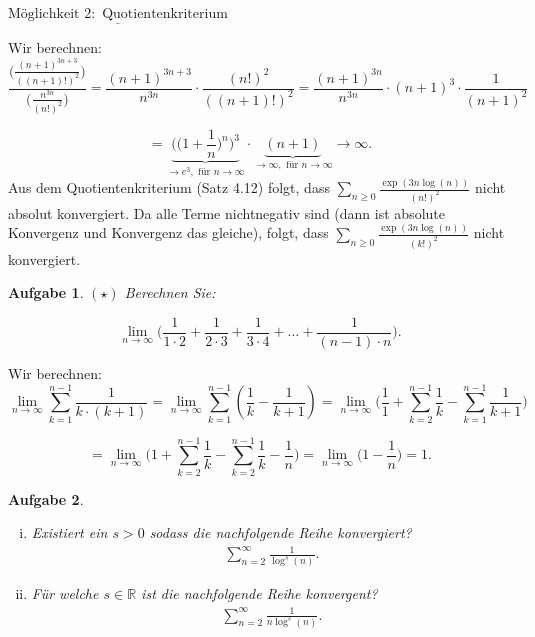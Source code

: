 \documentclass[a4paper, 20]{exam}
\newtheorem{ex}{Aufgabe}
\begin{document}
\begin{solution}
\begin{enumerate}[i.)]
$\underline{\text{M\"oglichkeit }2: \text{ Quotientenkriterium}}$

Wir berechnen:
$$ \frac{\bigg(\frac{(n+1)^{3n+3}}{((n+1)!)^2} \bigg)}{\bigg(\frac{n^{3n}}{(n!)^2} \bigg)} 
= \frac{(n+1)^{3n+3}}{n^{3n}} \cdot \frac{(n!)^2}{((n+1)!)^2}
= \frac{(n+1)^{3n}}{n^{3n}} \cdot (n+1)^3 \cdot \frac{1}{(n+1)^2}$$

$$=\underbrace{\bigg(\Big( 1+ \frac{1}{n} \Big)^{n}\bigg)^3}_{\longrightarrow e^3, \text{ f\"ur } n\longrightarrow \infty} \cdot \underbrace{(n+1)}_{\longrightarrow \infty, \text{ f\"ur } n \longrightarrow \infty} \longrightarrow \infty.$$
Aus dem Quotientenkriterium (Satz 4.12) folgt, dass $\sum_{n\geq 0} \frac{\exp(3n \log(n))}{(n!)^2}$ nicht absolut konvergiert. Da alle Terme nichtnegativ sind (dann ist absolute Konvergenz und Konvergenz das gleiche), folgt, dass $\sum_{n\geq 0} \frac{\exp(3n \log(n))}{(k!)^2}$ nicht konvergiert.
\end{enumerate}
\end{solution}


\begin{ex}{$(\star)$}
Berechnen Sie:

$$ \lim_{n \rightarrow \infty} \bigg( \frac{1}{1\cdot 2} + \frac{1}{2\cdot 3} + \frac{1}{3 \cdot 4} + \dots + \frac{1}{(n-1)\cdot n} \bigg).$$
\end{ex}
\begin{solution}
Wir berechnen:
$$ \lim_{n\rightarrow \infty} \sum_{k=1}^{n-1} \frac{1}{k\cdot (k+1)}
= \lim_{n\rightarrow \infty} \sum_{k=1}^{n-1} \left(\frac{1}{k}- \frac{1}{k+1} \right)
= \lim_{n\rightarrow \infty} \bigg(\frac{1}{1}+ \sum_{k=2}^{n-1} \frac{1}{k} - \sum_{k=1}^{n-1} \frac{1}{k+1}\bigg)$$

$$= \lim_{n\rightarrow \infty} \bigg(1+ \sum_{k=2}^{n-1} \frac{1}{k} - \sum_{k=2}^{n-1} \frac{1}{k} -\frac{1}{n}\bigg)
= \lim_{n\rightarrow \infty} \bigg( 1 - \frac{1}{n} \bigg)= 1.$$
\end{solution}

\begin{ex} \ \begin{enumerate}[i)]
\item Existiert ein $s >0$ sodass die nachfolgende Reihe konvergiert?
\begin{align*}
\sum_{n=2}^\infty \frac{1}{\log^s(n)}.
\end{align*}
\item Für welche $s \in \mathbb{R}$ ist die nachfolgende Reihe konvergent?
\begin{align*}
\sum_{n=2}^\infty \frac{1}{n \log^s (n) }.
\end{align*}
\end{enumerate}

\end{ex}
\end{document}
